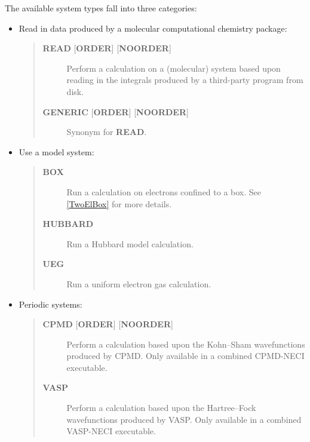 \documentclass[openany,a4paper,10pt,english]{manual}
\begin{document}
The available system types fall into three categories:
\begin{itemize}
\item {} 
Read in data produced by a molecular computational chemistry package:
\begin{quote}
\begin{description}
\item[\textbf{READ} {[}\textbf{ORDER}{]} {[}\textbf{NOORDER}{]}] \leavevmode
Perform a calculation on a (molecular) system based upon reading in the integrals produced
by a third-party program from disk.

\item[\textbf{GENERIC} {[}\textbf{ORDER}{]} {[}\textbf{NOORDER}{]}] \leavevmode
Synonym for \textbf{READ}.

\end{description}
\end{quote}

\item {} 
Use a model system:
\begin{quote}
\begin{description}
\item[\textbf{BOX}] \leavevmode
Run a calculation on electrons confined to a box.  See \hyperlink{twoelbox}{{[}TwoElBox{]}}
for more details.

\item[\textbf{HUBBARD}] \leavevmode
Run a Hubbard model calculation.

\item[\textbf{UEG}] \leavevmode
Run a uniform electron gas calculation.

\end{description}
\end{quote}

\item {} 
Periodic systems:
\begin{quote}
\begin{description}
\item[\textbf{CPMD} {[}\textbf{ORDER}{]} {[}\textbf{NOORDER}{]}] \leavevmode
Perform a calculation based upon the Kohn--Sham wavefunctions
produced by CPMD.  Only available in a combined CPMD-NECI
executable.

\item[\textbf{VASP}] \leavevmode
Perform a calculation based upon the Hartree--Fock wavefunctions
produced by VASP.  Only available in a combined VASP-NECI
executable.

\end{description}
\end{quote}

\end{itemize}
\end{document}
